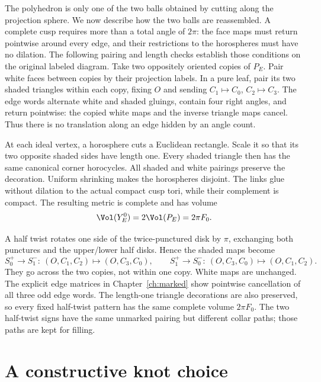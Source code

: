 The polyhedron is only one of the two balls obtained by cutting along the projection sphere. We now describe how the two balls are reassembled. A complete cusp requires more than a total angle of $2\pi$: the face maps must return pointwise around every edge, and their restrictions to the horospheres must have no dilation. The following pairing and length checks establish those conditions on the original labeled diagram.
Take two oppositely oriented copies of $P_E$. Pair white faces between copies by their projection labels. In a pure leaf, pair its two shaded triangles within each copy, fixing $O$ and sending $C_1\mapsto C_0$, $C_2\mapsto C_3$. The edge words alternate white and shaded gluings, contain four right angles, and return pointwise: the copied white maps and the inverse triangle maps cancel. Thus there is no translation along an edge hidden by an angle count.

At each ideal vertex, a horosphere cuts a Euclidean rectangle. Scale it so that its two opposite shaded sides have length one. Every shaded triangle then has the same canonical corner horocycles. All shaded and white pairings preserve the decoration. Uniform shrinking makes the horospheres disjoint. The links glue without dilation to the actual compact cusp tori, while their complement is compact. The resulting metric is complete and has volume
\begin{equation}\label{eq:complete-volume}
 \Vol(Y_E^0)=2\Vol(P_E)=2\pi F_0.
\end{equation}

A half twist rotates one side of the twice-punctured disk by $\pi$, exchanging both punctures and the upper/lower half disks. Hence the shaded maps become
\[
 S_0^+\to S_1^-:\ (O,C_1,C_2)\mapsto(O,C_3,C_0),\qquad
 S_1^+\to S_0^-:\ (O,C_3,C_0)\mapsto(O,C_1,C_2).
\]
They go across the two copies, not within one copy. White maps are unchanged. The explicit edge matrices in Chapter~\ref{ch:marked} show pointwise cancellation of all three odd edge words. The length-one triangle decorations are also preserved, so every fixed half-twist pattern has the same complete volume $2\pi F_0$. The two half-twist signs have the same unmarked pairing but different collar paths; those paths are kept for filling.

\section{A constructive knot choice}\label{sec:pairings}


